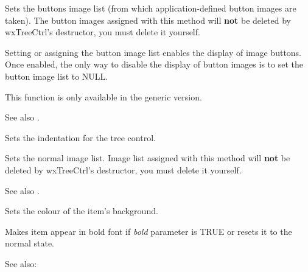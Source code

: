 \label{wxtreectrlsetbuttonsimagelist}


Sets the buttons image list (from which application-defined button images are taken).
The button images assigned with this method will
{\bf not} be deleted by wxTreeCtrl's destructor, you must delete it yourself.

Setting or assigning the button image list enables the display of image buttons.
Once enabled, the only way to disable the display of button images is to set
the button image list to NULL.

This function is only available in the generic version.

See also .

\label{wxtreectrlsetindent}


Sets the indentation for the tree control.

\label{wxtreectrlsetimagelist}


Sets the normal image list. Image list assigned with this method will
{\bf not} be deleted by wxTreeCtrl's destructor, you must delete it yourself.

See also .


\label{wxtreectrlsetitembackgroundcolour}


Sets the colour of the item's background.

\label{wxtreectrlsetitembold}


Makes item appear in bold font if {\it bold} parameter is TRUE or resets it to
the normal state.

See also: 

\label{wxtreectrlsetitemdata}

